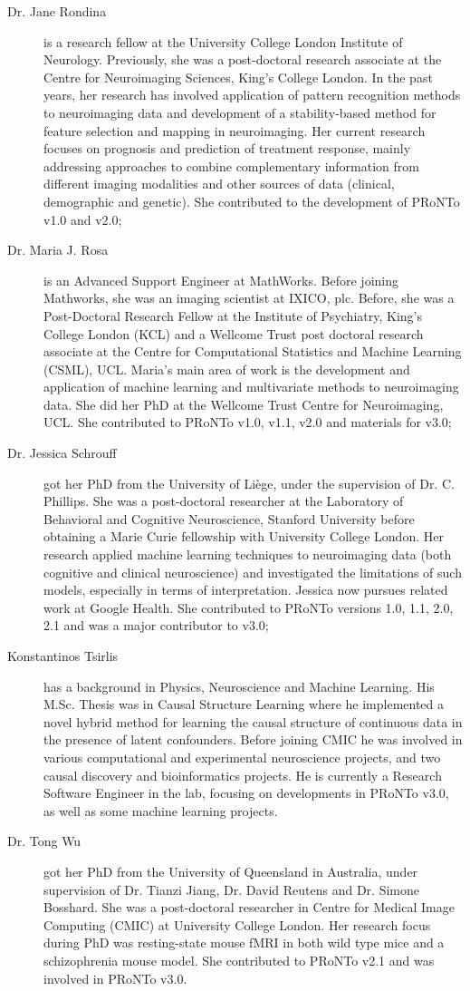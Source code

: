 \begin{description}
	\item[Dr. Jane Rondina] is a research fellow at the University College London Institute of Neurology. Previously, she was a post-doctoral research associate at the Centre for Neuroimaging Sciences, King's College London. In the past years, her research has involved application of pattern recognition methods to neuroimaging data and development of a stability-based method for feature selection and mapping in neuroimaging. Her current research focuses on prognosis and prediction of treatment response, mainly addressing approaches to combine complementary information from different imaging modalities and other sources of data (clinical, demographic and genetic). She contributed to the development of PRoNTo v1.0 and v2.0;
	\item[Dr. Maria J. Rosa] is an Advanced Support Engineer at MathWorks. Before joining Mathworks, she was an imaging scientist at IXICO, plc. Before, she was a Post-Doctoral Research Fellow at the Institute of Psychiatry, King's College London (KCL) and a Wellcome Trust post doctoral research associate at the Centre for Computational Statistics and Machine Learning (CSML), UCL. Maria's main area of work is the development and application of machine learning and multivariate methods to neuroimaging data. She did her PhD at the Wellcome Trust Centre for Neuroimaging, UCL. She contributed to PRoNTo v1.0, v1.1, v2.0 and materials for v3.0;
	\item[Dr. Jessica Schrouff] got her PhD from the University of Li\`ege, under the supervision of Dr. C. Phillips. She was a post-doctoral researcher at the Laboratory of Behavioral and Cognitive Neuroscience, Stanford University before obtaining a Marie Curie fellowship with University College London. Her research applied machine learning techniques to neuroimaging data (both cognitive and clinical neuroscience) and investigated the limitations of such models, especially in terms of interpretation. Jessica now pursues related work at Google Health. She contributed to PRoNTo versions 1.0, 1.1, 2.0, 2.1 and was a major contributor to v3.0;
	\item[Konstantinos Tsirlis] has a background in Physics, Neuroscience and Machine Learning. His M.Sc. Thesis was in Causal Structure Learning where he implemented a novel hybrid method for learning the causal structure of continuous data in the presence of latent confounders. Before joining CMIC he was involved in various computational and experimental neuroscience projects, and two causal discovery and bioinformatics projects. He is currently a Research Software Engineer in the lab, focusing on developments in PRoNTo v3.0, as well as some machine learning projects.
	\item[Dr. Tong Wu] got her PhD from the University of Queensland in Australia, under supervision of Dr. Tianzi Jiang, Dr. David Reutens and Dr. Simone Bosshard. She was a post-doctoral researcher in Centre for Medical Image Computing (CMIC) at University College London. Her research focus during PhD was resting-state mouse fMRI in both wild type mice and a schizophrenia mouse model. She contributed to PRoNTo v2.1 and was involved in PRoNTo v3.0.
	

\end{description}
